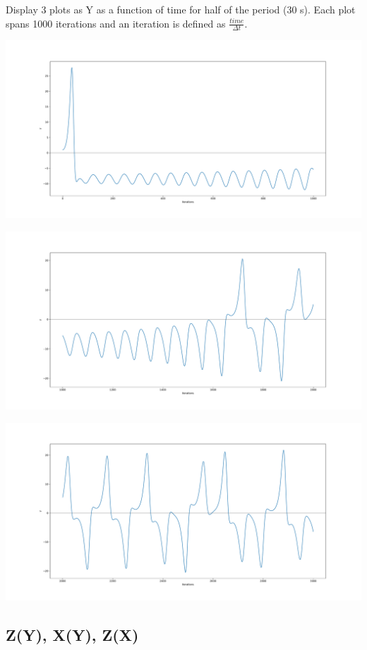 \documentclass{article}
\begin{document}
Display 3 plots as Y as a function of time for half of the period (30 s). Each plot spans 1000 iterations and an iteration is defined as $\frac{time}{\Delta t}$.

\includegraphics[scale=0.2]{lorenz_1.pdf}

\includegraphics[scale=0.2]{lorenz_2.pdf}

\includegraphics[scale=0.2]{lorenz_3.pdf}

\subsection{Z(Y), X(Y), Z(X)}
\end{document}
